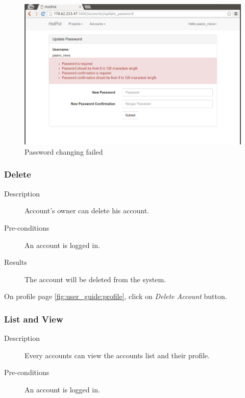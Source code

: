 \begin{figure}[bth]                                                                                                                                                  \myfloatalign
\includegraphics[width=1.0\linewidth]{gfx/chapter_5/account/change_password_failed}
\caption[Password changing failed]{Password changing failed}
\label{fig:user_guide:account:change_password_failed}
\end{figure}

\clearpage

\subsubsection{Delete}
\label{ch:result:user_guide:account:delete}

\begin{description}
\item[Description] Account's owner can delete his account.
\item[Pre-conditions] An account is logged in.
\item[Results] The account will be deleted from the system.
\end{description}

On profile page \autoref{fig:user_guide:profile}, click on \emph{Delete Account} button.

\subsubsection{List and View}
\label{ch:result:user_guide:account:list}

\begin{description}
\item[Description] Every accounts can view the accounts list and their profile.
\item[Pre-conditions] An account is logged in.
\end{description}

